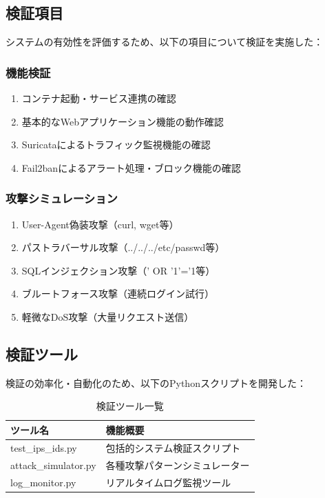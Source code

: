 \documentclass[12pt,a4paper]{article}
\begin{document}
\subsection{検証項目}

システムの有効性を評価するため、以下の項目について検証を実施した：

\subsubsection{機能検証}
\begin{enumerate}
    \item コンテナ起動・サービス連携の確認
    \item 基本的なWebアプリケーション機能の動作確認
    \item Suricataによるトラフィック監視機能の確認
    \item Fail2banによるアラート処理・ブロック機能の確認
\end{enumerate}

\subsubsection{攻撃シミュレーション}
\begin{enumerate}
    \item User-Agent偽装攻撃（curl, wget等）
    \item パストラバーサル攻撃（../../../etc/passwd等）
    \item SQLインジェクション攻撃（' OR '1'='1等）
    \item ブルートフォース攻撃（連続ログイン試行）
    \item 軽微なDoS攻撃（大量リクエスト送信）
\end{enumerate}

\subsection{検証ツール}

検証の効率化・自動化のため、以下のPythonスクリプトを開発した：

\begin{table}[H]
\centering
\caption{検証ツール一覧}
\begin{tabular}{@{}lp{8cm}@{}}
\toprule
ツール名 & 機能概要 \\
\midrule
test\_ips\_ids.py & 包括的システム検証スクリプト \\
attack\_simulator.py & 各種攻撃パターンシミュレーター \\
log\_monitor.py & リアルタイムログ監視ツール \\
\bottomrule
\end{tabular}
\end{table}
\end{document}
